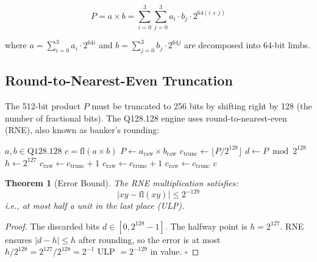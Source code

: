 \documentclass[11pt]{article}
\newtheorem{theorem}{Theorem}
\begin{document}
\begin{equation}
P = a \times b = \sum_{i=0}^{3} \sum_{j=0}^{3} a_i \cdot b_j \cdot 2^{64(i+j)}
\end{equation}

where $a = \sum_{i=0}^{3} a_i \cdot 2^{64i}$ and $b = \sum_{j=0}^{3} b_j \cdot 2^{64j}$ are decomposed into 64-bit limbs.

\subsection{Round-to-Nearest-Even Truncation}

The 512-bit product $P$ must be truncated to 256 bits by shifting right by 128 (the number of fractional bits). The Q128.128 engine uses round-to-nearest-even (RNE), also known as banker's rounding:

\begin{algorithm}
\caption{RNE Multiplication}\label{alg:rne}
\begin{algorithmic}[1]
\Require $a, b \in \text{Q128.128}$
\Ensure $c = \mathrm{fl}(a \times b)$
\State $P \gets a_{\text{raw}} \times b_{\text{raw}}$ 
\State $c_{\text{trunc}} \gets \lfloor P / 2^{128} \rfloor$ 
\State $d \gets P \bmod 2^{128}$ 
\State $h \gets 2^{127}$ 
    \State $c_{\text{raw}} \gets c_{\text{trunc}} + 1$ 
    \State $c_{\text{raw}} \gets c_{\text{trunc}} + 1$ 
\Else
    \State $c_{\text{raw}} \gets c_{\text{trunc}}$ 
\EndIf
\State \Return $c$
\end{algorithmic}
\end{algorithm}

\begin{theorem}[Error Bound]
The RNE multiplication satisfies:
\begin{equation}
|xy - \mathrm{fl}(xy)| \leq 2^{-129}
\end{equation}
i.e., at most half a unit in the last place (ULP).
\end{theorem}

\begin{proof}
The discarded bits $d \in [0, 2^{128} - 1]$. The halfway point is $h = 2^{127}$. RNE ensures $|d - h| \leq h$ after rounding, so the error is at most $h / 2^{128} = 2^{127} / 2^{128} = 2^{-1}$ ULP $= 2^{-129}$ in value. $\square$
\end{proof}
\end{document}
